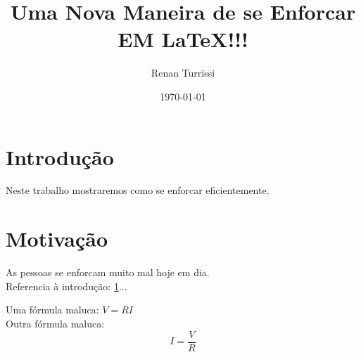 \documentclass{article}
\author{Renan Turrissi}
\date{\today}
\title{Uma Nova Maneira de se Enforcar EM \LaTeX !!!}
\begin{document}
\maketitle

\newpage

\section{Introdução}\label{sec:intro}
Neste trabalho mostraremos como se enforcar eficientemente.

\section{Motivação}\label{sec:motiv}
As pessoas se enforcam muito mal hoje em dia.\\
Referencia à introdução: \ref{sec:intro}...

Uma fórmula maluca: $ V =RI $ \\
Outra fórmula maluca: $$ I = \frac{V}{R} $$
\end{document}
